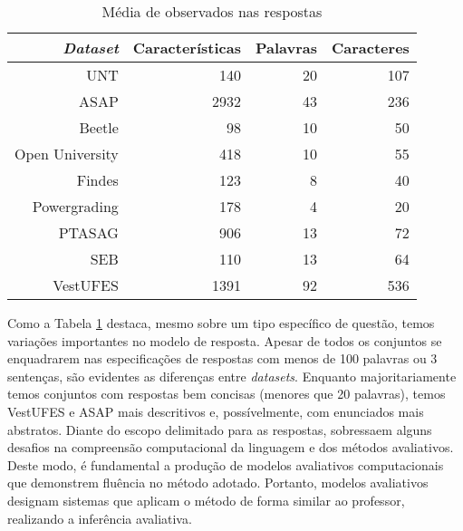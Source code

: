 \begin{table}
\centering
\caption{Média de observados nas respostas }
\label{tab-features}
\begin{tabular}{|r | r r r|} \hline
\textit{Dataset} & Características & Palavras & Caracteres \\
\hline
UNT & 140 & 20 & 107 \\
ASAP & 2932 & 43 & 236 \\
Beetle & 98 & 10 & 50 \\
Open University & 418 & 10 & 55 \\
Findes & 123 & 8 & 40 \\
Powergrading & 178 & 4 & 20 \\
PTASAG & 906 & 13 & 72 \\
SEB & 110 & 13 & 64 \\
VestUFES & 1391 & 92 & 536 \\
\hline \hline
\end{tabular}
\end{table}

Como a Tabela \ref{tab-features} destaca, mesmo sobre um tipo específico de questão, temos variações importantes no modelo de resposta. Apesar de todos os conjuntos se enquadrarem nas especificações de respostas com menos de 100 palavras ou 3 sentenças, são evidentes as diferenças entre \textit{datasets}. Enquanto majoritariamente temos conjuntos com respostas bem concisas (menores que 20 palavras), temos VestUFES e ASAP mais descritivos e, possívelmente, com enunciados mais abstratos. Diante do escopo delimitado para as respostas, sobressaem alguns desafios na compreensão computacional da linguagem e dos métodos avaliativos. Deste modo, é fundamental a produção de modelos avaliativos computacionais que demonstrem fluência no método adotado. Portanto, modelos avaliativos designam sistemas que aplicam o método de forma similar ao professor, realizando a inferência avaliativa.

